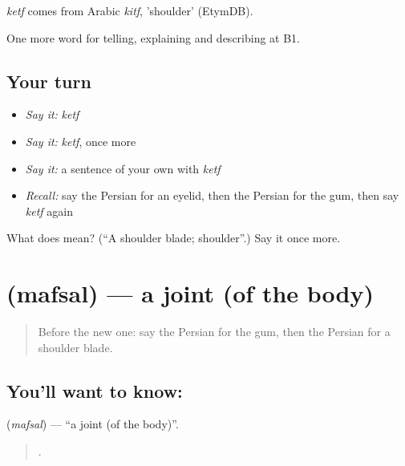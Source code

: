 \begin{cousinweb}
\emph{ketf} comes from Arabic \emph{kitf}, 'shoulder' (EtymDB).
\end{cousinweb}

\begin{grammarlens}[title={What you've built}]
One more word for telling, explaining and describing at B1.
\end{grammarlens}

\subsection*{Your turn}
\begin{itemize}
\raggedright
  \item \emph{Say it:} \emph{ketf}
  \item \emph{Say it:} \emph{ketf}, once more
  \item \emph{Say it:} a sentence of your own with \emph{ketf}
  \item \emph{Recall:} say the Persian for an eyelid, then the Persian for the gum, then say \emph{ketf} again
\end{itemize}

\begin{tcolorbox}[breakable,colback=teal!4,colframe=teal!35!black,title={Before you move on}]
What does  mean? (\textquotedblleft{}A shoulder blade; shoulder\textquotedblright{}.) Say it once more.
\end{tcolorbox}
\section[\texorpdfstring{\fa{مفصل} (mafsal)}{مفصل (mafsal)}]{ (mafsal) — a joint (of the body)}

\label{lesson:FA-C497-mafsal}



\begin{quote}
Before the new one: say the Persian for the gum, then the Persian for a shoulder blade.
\end{quote}

\subsection*{You'll want to know: }
\textbf{} (\emph{mafsal}) — \textquotedblleft{}a joint (of the body)\textquotedblright{}.

\begin{quote}
     .
\end{quote}

